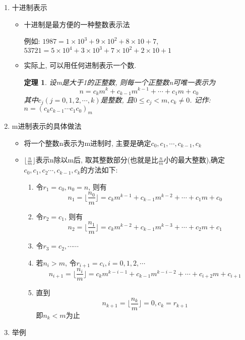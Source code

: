 \documentclass[UTF8]{ctexart}
\newtheorem{theorem}{\hspace{2em}定理}[section]
\begin{document}
    \begin{enumerate}
        \item 十进制表示
        \begin{itemize}
            \renewcommand{\labelitemi}{\scriptsize$\blacksquare$}
            \item 十进制是最方便的一种整数表示法

            例如: $1987=1\times 10^3+9\times 10^2+8\times 10+7$,
            $53721=5\times 10^4+3\times 10^3+7\times 10^2+2\times 10+1$

            \item 实际上, 可以用任何进制表示一个数.
            \begin{theorem}
                设m是大于1的正整数, 则每一个正整数n可唯一表示为
                $$n=c_km^k+c_{k-1}m^{k-1}+\cdots +c_1m+c_0$$
                其中$c_j(j=0,1,2,\cdots ,k)$是整数, 且$0\le c_j < m, c_k\ne 0$. 记作: $n=(c_kc_{k-1}\cdots c_1c_0)_m$
            \end{theorem}
        \end{itemize}
        \item m进制表示的具体做法
        \begin{itemize}
            \renewcommand{\labelitemi}{\scriptsize$\blacksquare$}
            \item 将一个整数n表示为m进制时, 主要是确定$c_0, c_1, \cdots, c_{k-1}, c_{k}$
            \item $\lfloor \frac{n}{m} \rfloor$表示n除以m后, 取其整数部分(也就是比$\frac{n}{m}$小的最大整数),确定$c_0,c_1,c_2\cdots ,c_{k-1},c_k$的方法如下:
            \begin{enumerate}
                \item 令$r_1=c_0, n_0=n$, 则有
                $$n_1=\lfloor \frac{n_0}{m} \rfloor=c_km^{k-1}+c_{k-1}m^{k-2}+\cdots +c_1m+c_0$$

                \item 令$r_2=c_1$, 则有
                $$n_2=\lfloor \frac{n_1}{m} \rfloor=c_km^{k-2}+c_{k-1}m^{k-3}+\cdots +c_2m+c_1$$

                \item 令$r_3=c_2, \cdots \cdots$
                \item 若$n_i>m$, 令$r_{i+1}=c_i, i=0, 1, 2, \cdots$
                $$n_{i+1}=\lfloor \frac{n_i}{m} \rfloor=c_km^{k-i-1}+c_{k-1}m^{k-i-2}+\cdots +c_{i+2}m+c_{i+1}$$

                \item 直到
                $$n_{k+1}=\lfloor \frac{n_k}{m} \rfloor=0, c_k=r_{k+1}$$
                即$n_k<m$为止
            \end{enumerate}
        \end{itemize}
        \item 举例


\end{enumerate}
\end{document}
